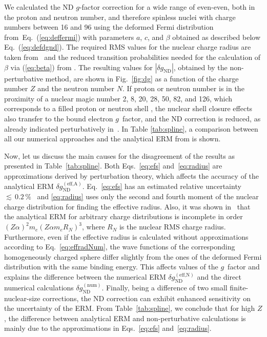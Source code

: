 We calculated the ND $g$-factor correction for a wide range of even-even, both in the proton and neutron number, and therefore spinless nuclei with charge numbers between 16 and 96 using the deformed Fermi distribution from~Eq.~(\ref{eq:deffermi}) with parameters $a$, $c$, and $\beta$ obtained as described below Eq.~(\ref{eq:defdgnd}). The required RMS values for the nuclear charge radius are taken from~\cite{Angeli2013} and the reduced transition probabilities needed for the calculation of $\beta$ via (\ref{eq:beta}) from \cite{ENSDF}. The resulting values for $|\delta g_{\text{ND}}|$, obtained by the non-perturbative method, are shown in Fig.~\ref{fig:dg} as a function of the charge number $Z$ and the neutron number $N$. If proton or neutron number is in the proximity of a nuclear magic number 2, 8, 20, 28, 50, 82, and 126, which corresponds to a filled proton or neutron shell \cite{Ring}, the nuclear shell closure effects also transfer to the bound electron $g$~factor, and the ND correction is reduced, as already indicated perturbatively in~\cite{michel2015}. In Table \ref{tab:spline}, a comparison between all our numerical approaches and the analytical ERM from \cite{jacek2012} is shown.

Now, let us discuss the main causes for the disagreement of the results as presented in Table~\ref{tab:spline}. Both Eqs.~\eqref{eq:efs} and~\eqref{eq:radius} are approximations derived by perturbation theory, which affects the accuracy of the analytical ERM $\delta g_{\text{ND}}^{(\text{eff,A})}$. Eq.~\eqref{eq:efs} has an estimated relative uncertainty ${\scriptstyle\lesssim}\,0.2\,\%$~\cite{Shabaev1993} and \eqref{eq:radius} uses only the second and fourth moment of the nuclear charge distribution for finding the effective radius. Also, it was shown in~\cite{karshenboim2018} that the analytical ERM for arbitrary charge distributions is incomplete in order $(Z\alpha)^2m_e(Z\alpha m_e R_N)^3$, where $R_N$ is the nuclear RMS charge radius. Furthermore, even if the effective radius is calculated without approximations according to Eq.~\eqref{eq:effradNum}, the wave functions of the corresponding homogeneously charged sphere differ slightly from the ones of the deformed Fermi distribution with the same binding energy. This affects values of the $g$~factor and explains the difference between the numerical ERM $\delta g_{\text{ND}}^{(\text{eff,N})}$ and the direct numerical calculations $\delta g_{\text{ND}}^{(\text{num})}$. 
Finally, being a difference of two small finite-nuclear-size corrections, the ND correction can exhibit enhanced sensitivity on the uncertainty of the ERM.
From Table~\ref{tab:spline}, we conclude that for high $Z$, the difference between analytical ERM and non-perturbative calculations is mainly due to the approximations in Eqs.~\eqref{eq:efs} and~\eqref{eq:radius}.

